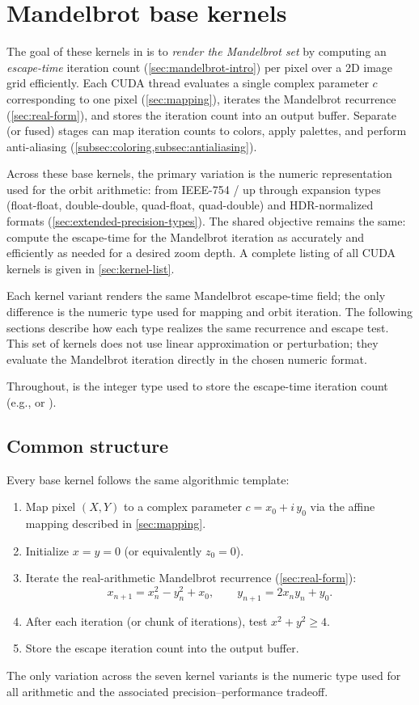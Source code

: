 \section{Mandelbrot base kernels}
\label{sec:mandel-base-kernels}

The goal of these kernels in \FractalShark{} is to \emph{render the Mandelbrot set}
by computing an \emph{escape-time} iteration count (\cref{sec:mandelbrot-intro}) per pixel over a 2D image
grid efficiently. Each CUDA thread evaluates a single complex parameter \(c\)
corresponding to one pixel (\cref{sec:mapping}), iterates the Mandelbrot recurrence (\cref{sec:real-form}), and stores the
iteration count into an output buffer. Separate (or fused) stages can map
iteration counts to colors, apply palettes, and perform anti-aliasing
(\cref{subsec:coloring,subsec:antialiasing}).

Across these base kernels, the primary variation is the numeric representation
used for the orbit arithmetic: from IEEE-754 / up
through expansion types (float-float, double-double, quad-float, quad-double)
and HDR-normalized formats (\cref{sec:extended-precision-types}). The shared objective remains the same: compute the
escape-time for the Mandelbrot iteration as accurately and efficiently as needed
for a desired zoom depth.  A complete listing of all CUDA kernels is given in
\cref{sec:kernel-list}.

Each kernel variant renders the same Mandelbrot escape-time field; the only
difference is the numeric type used for mapping and orbit iteration. The
following sections describe how each type realizes the same recurrence and
escape test.  This set of kernels does not use linear approximation or
perturbation; they evaluate the Mandelbrot iteration directly in the
chosen numeric format.

Throughout,  is the integer type used to store the escape-time
iteration count (e.g.,  or ).

\subsection{Common structure}

Every base kernel follows the same algorithmic template:
\begin{enumerate}
  \item Map pixel \((X,Y)\) to a complex parameter \(c = x_0 + i\,y_0\)
        via the affine mapping described in \cref{sec:mapping}.
  \item Initialize \(x = y = 0\) (or equivalently \(z_0 = 0\)).
  \item Iterate the real-arithmetic Mandelbrot recurrence (\cref{sec:real-form}):
        \[
          x_{n+1}=x_n^2-y_n^2+x_0,\qquad y_{n+1}=2x_ny_n+y_0.
        \]
  \item After each iteration (or chunk of iterations), test \(x^2 + y^2 \ge 4\).
  \item Store the escape iteration count into the output buffer.
\end{enumerate}
The only variation across the seven kernel variants is the numeric type used for
all arithmetic and the associated precision--performance tradeoff.

